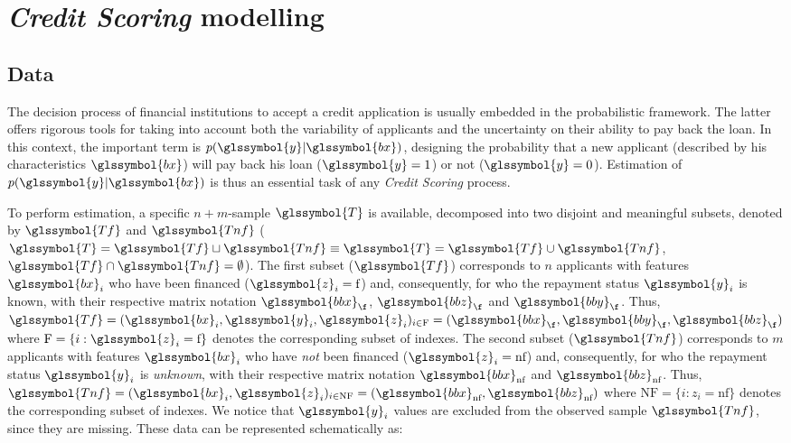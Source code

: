\section{\textit{Credit Scoring} modelling} \label{sec:criteres}

\subsection{Data} 

The decision process of financial institutions to accept a credit application is usually embedded in the  probabilistic framework. The latter offers rigorous tools for taking into account both the variability of applicants and the uncertainty on their ability to pay back the loan. In this context, the important term is $p(\glssymbol{y}|\glssymbol{bx})$, designing the probability that a new applicant (described by his characteristics $\glssymbol{bx}$) will pay back his loan ($\glssymbol{y}=1$) or not ($\glssymbol{y}=0$). Estimation of $p(\glssymbol{y}|\glssymbol{bx})$ is thus an essential task of any \textit{Credit Scoring} process.

To perform estimation, a specific $n + m$-sample $\glssymbol{T}$ is available, decomposed into two disjoint and meaningful subsets, denoted by $\glssymbol{Tf}$ and $\glssymbol{Tnf}$ ($\glssymbol{T}=\glssymbol{Tf} \sqcup \glssymbol{Tnf} \equiv \glssymbol{T}=\glssymbol{Tf} \cup \glssymbol{Tnf}$, $\glssymbol{Tf} \cap \glssymbol{Tnf}=\emptyset$). The first subset ($\glssymbol{Tf}$) corresponds to $n$ applicants with features $\glssymbol{bx}_i$ who have been financed ($\glssymbol{z}_i={\text{f}}$) and, consequently, for who the repayment status $\glssymbol{y}_i$ is known, with their respective matrix notation $\glssymbol{bbx}_\f$, $\glssymbol{bbz}_\f$ and $\glssymbol{bby}_\f$. Thus, $\glssymbol{Tf}=(\glssymbol{bx}_i,\glssymbol{y}_i,\glssymbol{z}_i)_{i\in \text{F}} = (\glssymbol{bbx}_\f,\glssymbol{bby}_\f,\glssymbol{bbz}_\f)$ where $\text{F}=\{i:\glssymbol{z}_i={\text{f}}\}$ denotes the corresponding subset of indexes. The second subset ($\glssymbol{Tnf}$) corresponds to $m$ applicants with features $\glssymbol{bx}_i$ who have {\it not} been financed ($\glssymbol{z}_i={\text{nf}}$) and, consequently, for who the repayment status $\glssymbol{y}_i$ is {\it unknown}, with their respective matrix notation $\glssymbol{bbx}_{\text{nf}}$ and $\glssymbol{bbz}_{\text{nf}}$. Thus, $\glssymbol{Tnf}=(\glssymbol{bx}_i,\glssymbol{z}_i)_{i\in \text{NF}} = (\glssymbol{bbx}_{\text{nf}}, \glssymbol{bbz}_{\text{nf}})$ where $\text{NF}=\{i:z_i={\text{nf}}\}$ denotes the corresponding subset of indexes. We notice that $\glssymbol{y}_i$ values are excluded from the observed sample $\glssymbol{Tnf}$, since they are missing. These data can be represented schematically as:

